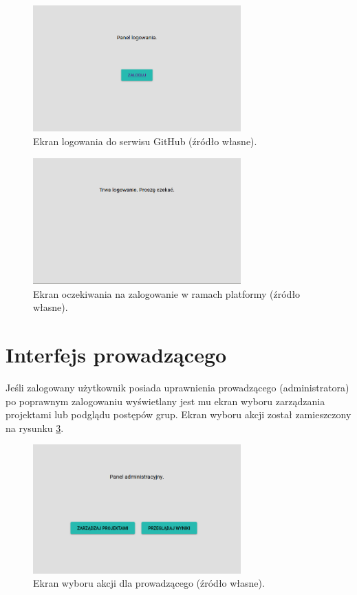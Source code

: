 \begin{figure}[h]
    \centering
    \includegraphics[width = 8cm]{chapter04/log_in_button.png}
    \caption{Ekran logowania do serwisu GitHub (źródło własne).}
    \label{fig:log_in_butoon}
\end{figure}

\begin{figure}[H]
    \centering
    \includegraphics[width = 8cm]{chapter04/wait_for_login.png}
    \caption{Ekran oczekiwania na zalogowanie w ramach platformy (źródło własne).}
    \label{fig:wait_for_login}
\end{figure}

\section{Interfejs prowadzącego}

Jeśli zalogowany użytkownik posiada uprawnienia prowadzącego (administratora) po poprawnym zalogowaniu wyświetlany jest mu ekran wyboru zarządzania projektami lub podglądu postępów grup.
Ekran wyboru akcji został zamieszczony na rysunku \ref{fig:lecturer_actions}.

\begin{figure}[h]
    \centering
    \includegraphics[width = 8cm]{chapter04/lecturer_actions.png}
    \caption{Ekran wyboru akcji dla prowadzącego (źródło własne).}
    \label{fig:lecturer_actions}
\end{figure}

